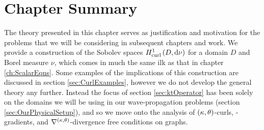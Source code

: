 \section{Chapter Summary} \label{sec:CurlSummary}
The theory presented in this chapter serves as justification and motivation for the problems that we will be considering in subsequent chapters and work.
We provide a construction of the Sobolev spaces $H^1_\mathrm{curl}\left( D, \mathrm{d}\nu \right)$ for a domain $D$ and Borel measure $\nu$, which comes in much the same ilk as that in chapter \ref{ch:ScalarEqns}.
Some examples of the implications of this construction are discussed in section \ref{sec:CurlExamples}, however we do not develop the general theory any further.
Instead the focus of section \ref{sec:ktOperator} has been solely on the domains we will be using in our wave-propagation problems (section \ref{sec:OurPhysicalSetup}), and so we move onto the analysis of $\left( \kappa, \theta \right)$-curls, -gradients, and $\nabla^{\left( \kappa, \theta \right)}$-divergence free conditions on graphs. \newline

